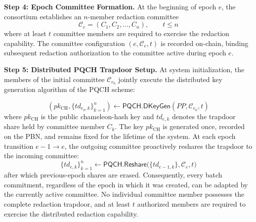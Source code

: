 \documentclass[lettersize,journal]{IEEEtran}
\begin{document}
    \textbf{Step 4: Epoch Committee Formation.}
    At the beginning of epoch $e$, the consortium establishes an
    $n$-member redaction committee
    \begin{equation}
    \mathcal{C}_e={(C_1,C_2,\ldots,C_n)}, \qquad t\leq n
    \end{equation}
    where at least $t$ committee members are required to exercise the
    redaction capability. The committee configuration
    $(e,\mathcal{C}_e,t)$ is recorded on-chain, binding subsequent
    redaction authorization to the committee active during epoch $e$.
    
    \textbf{Step 5: Distributed PQCH Trapdoor Setup.} {At system initialization, the members of the initial committee $\mathcal{C}_{e_0}$} jointly execute the distributed key
    generation algorithm of the PQCH scheme:
    
    \begin{equation}
    {(pk_{\mathrm{CH}},\{td_{e_0,k}\}_{k=1}^{n})
    \leftarrow
    \mathsf{PQCH.DKeyGen}(PP,\mathcal{C}_{e_0},t)}
    \end{equation}
    where $pk_{\mathrm{CH}}$ is the public chameleon-hash key and
    $ {td_{e,k}}$ denotes the trapdoor share held by committee member $C_k$.
     {The key $pk_{\mathrm{CH}}$ is generated once, recorded on
    the PBN, and remains fixed for the lifetime of the system. At each epoch
    transition $e-1\rightarrow e$, the outgoing committee proactively reshares
    the trapdoor to the incoming committee:
    \begin{equation}
    \{td_{e,k}\}_{k=1}^{n}\leftarrow
    \mathsf{PQCH.Reshare}\big(\{td_{e-1,k}\},\mathcal{C}_e,t\big)
    \end{equation}
    after which previous-epoch shares are erased. Consequently, every batch
    commitment, regardless of the epoch in which it was created, can be
    adapted by the currently active committee.}
    No individual committee member possesses the complete redaction
    trapdoor, and at least $t$ authorized members are required to exercise
    the distributed redaction capability.
    
\end{document}
